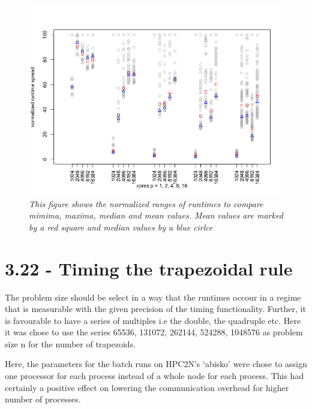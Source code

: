 \documentclass[a4paper,11pt,twoside]{article}
\begin{document}
\begin{figure}
  \centering
    \includegraphics[width=1\textwidth]{spread.png}
    \caption{\textit{This figure shows the normalized ranges of runtimes to compare mimima, maxima, median and mean values. Mean values are marked by a red square and median values by a blue cirlce}}
    \label{fig:spread}
\end{figure}


\section{3.22 - Timing the trapezoidal rule}
The problem size should be select in a way that the runtimes occour in a regime that is measurable with the given precision of the timing functionality. Further, it is favourable to have a series of multiples i.e the double, the quadruple etc. Here it was chose to use the series 65536, 131072, 262144, 524288, 1048576 as problem size n for the number of trapezoids.

Here, the parameters for the batch runs on HPC2N's `abisko' were chose to assign one processor for each process instead of a whole node for each process. This had certainly a positive effect on lowering the communication overhead for higher number of processes. 
\end{document}
